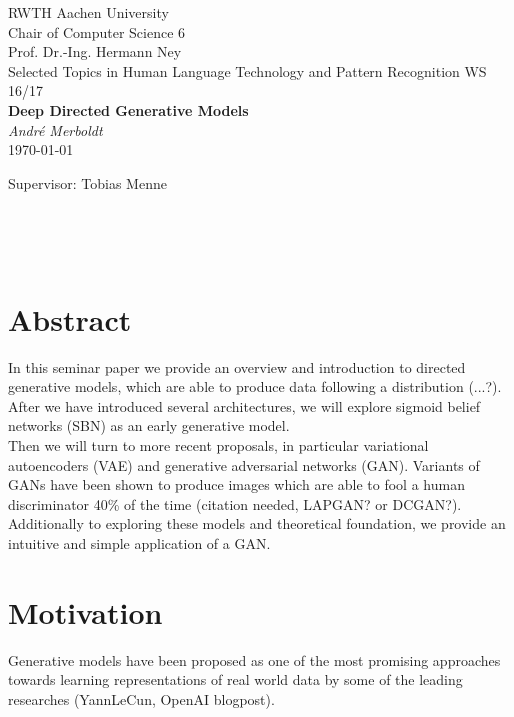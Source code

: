 \documentclass[twoside,11pt,a4paper]{article}
\theoremstyle{break}
\begin{document}
\pagestyle{empty}

\begin{center}

    RWTH Aachen University\\
    Chair of Computer Science 6 \\
    Prof. Dr.-Ing. Hermann Ney\\[6ex]
    Selected Topics in Human Language Technology and Pattern Recognition WS 16/17\\[12ex]
   
    \LARGE
    \textbf{Deep Directed Generative Models} \\[6ex]
    \textit{André Merboldt} \\[6ex]
    \today

    \vfill
    \Large Supervisor: Tobias Menne
	    
\end{center}

\newpage
\ 
\newpage


\pagestyle{headings}
\tableofcontents
\listoftables
\listoffigures
\newpage
\pagestyle{empty}
\ 
\newpage
\pagestyle{headings}


\section{Abstract}
\label{sec:abstract}
In this seminar paper we provide an overview and introduction to directed generative models,
which are able to produce data following a distribution (...?).
After we have introduced several architectures, we will explore sigmoid belief networks (SBN)
as an early generative model.\\

Then we will turn to more recent proposals, in particular variational autoencoders (VAE) and
generative adversarial networks (GAN).
Variants of GANs have been shown to produce images which are able to fool a human discriminator 40\% of the time (citation needed, LAPGAN? or DCGAN?).
Additionally to exploring these models and theoretical foundation, we provide an intuitive and simple application of a GAN.






\section{Motivation}
\label{sec:motivation}
Generative models have been proposed as one of the most promising approaches towards
learning representations of real world data by some of the leading researches (YannLeCun, OpenAI blogpost).
\end{document}

